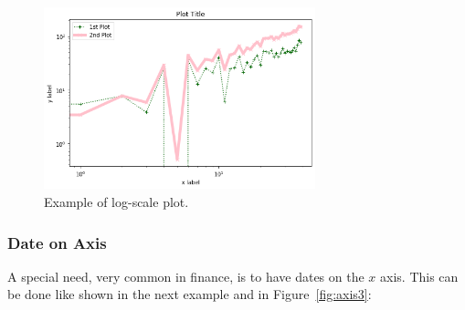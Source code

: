 \begin{figure}[htb]
	\centering
	\includegraphics[width=0.7\textwidth]{figures/axis2}
	\caption{Example of log-scale plot.}
	\label{fig:axis2}
\end{figure}

\subsubsection{Date on Axis}\label{date-on-axis}

A special need, very common in finance, is to have dates on the \(x\)
axis. This can be done like shown in the next example and in Figure~\ref{fig:axis3}:

